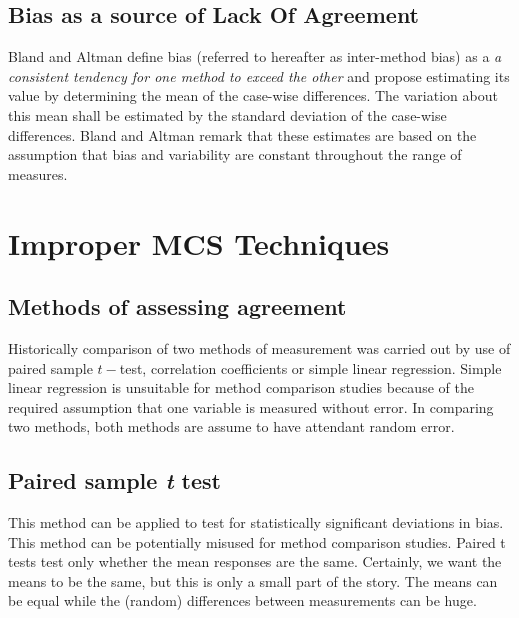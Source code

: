 \documentclass[12pt, a4paper]{report}
\theoremstyle{plain}
\theoremstyle{definition}
\theoremstyle{remark}
\begin{document}
	


	
	
	


	

	\section{Bias as a source of Lack Of Agreement}
	Bland and Altman define bias (referred to hereafter as inter-method bias) as a \emph{a consistent tendency for one method to exceed the other} and propose estimating its value by determining the mean of the case-wise differences. 
	The variation about this mean shall be estimated by the  standard deviation of the case-wise differences. Bland and Altman remark that these estimates are based on the assumption that bias and variability are constant throughout the
	range of measures.
	
	
	
	
	

	\chapter{Improper MCS Techniques}
	
	\section{Methods of assessing agreement}

		
	Historically comparison of two methods of measurement was carried
	out by use of paired sample $t-$test, correlation coefficients or
	simple linear regression. Simple linear regression is unsuitable for method comparison studies because of the required assumption that one variable is measured without error. In comparing two methods, both methods are assume to have attendant random error.

\section{Paired sample \emph{t} test}
This method can be applied to test for statistically significant deviations in bias. This method can be potentially misused for method comparison studies. Paired t tests test only whether the mean responses are the same. Certainly, we want the means to be the same, but this is only a small part of the story. The means can be equal while the (random) differences between measurements can be huge.
\end{document}
